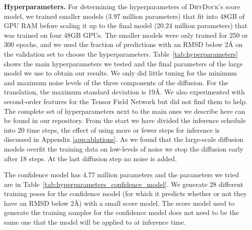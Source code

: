 \documentclass{article} \usepackage{iclr2023_conference,times}
\newcommand{\new}[1]{#1}
\begin{document}
\textbf{Hyperparameters.} For determining the hyperparameters of \textsc{DiffDock}'s score model, we trained smaller models (3.97 million parameters) that fit into 48GB of GPU RAM before scaling it up to the final model (20.24 million parameters) that was trained on four 48GB GPUs. The smaller models were only trained for 250 or 300 epochs, and we used the fraction of predictions with an RMSD below 2\AA{} on the validation set to choose the hyperparameters. Table~\ref{tab:hyperparameters} shows the main hyperparameters we tested and the final parameters of the large model we use to obtain our results. We only did little tuning for the minimum and maximum noise levels of the three components of the diffusion. For the translation, the maximum standard deviation is 19\AA{}. We also experimented with second-order features for the Tensor \new{F}ield Network but did not find them to help. The complete set of hyperparameters next to the main ones we describe here can be found in our repository. \new{From the start we have divided the inference schedule into 20 time steps, the effect of using more or fewer steps for inference is discussed in Appendix \ref{app:ablations}. As we found that the large-scale diffusion models overfit the training data on low-levels of noise we stop the diffusion early after 18 steps. At the last diffusion step no noise is added.}

The confidence model has 4.77 million parameters and the parameters we tried are in Table~\ref{tab:hyperparameters_confidence_model}. We generate 28 different training poses for the confidence model (for which it predicts whether or not they have an RMSD below 2\AA{}) with a \new{small} score model. The score model used to generate the training samples for the confidence model \new{does not need to be the same one that the model will be applied to at inference time.}
\end{document}
